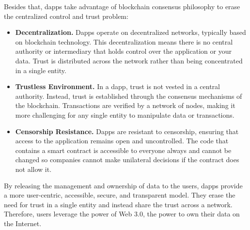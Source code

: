{Besides that, dapps take advantage of blockchain consensus philosophy to erase the centralized control and trust problem:}
\begin{itemize}
    \item \textbf{Decentralization.} Dapps operate on decentralized networks, typically based on blockchain technology. This decentralization means there is no central authority or intermediary that holds control over the application or your data. Trust is distributed across the network rather than being concentrated in a single entity.
    \item \textbf{Trustless Environment.} In a dapp, trust is not vested in a central authority. Instead, trust is established through the consensus mechanisms of the blockchain. Transactions are verified by a network of nodes, making it more challenging for any single entity to manipulate data or transactions.
    \item \textbf{Censorship Resistance.} Dapps are resistant to censorship, ensuring that access to the application remains open and uncontrolled. The code that contains a smart contract is accessible to everyone always and cannot be changed so companies cannot make unilateral decisions if the contract does not allow it.

\end{itemize}
{By releasing the management and ownership of data to the users, dapps provide a more user-centric, accessible, secure, and transparent model. They erase the need for trust in a single entity and instead share the trust across a network. Therefore, users leverage the power of Web 3.0, the power to own their data on the Internet.}

